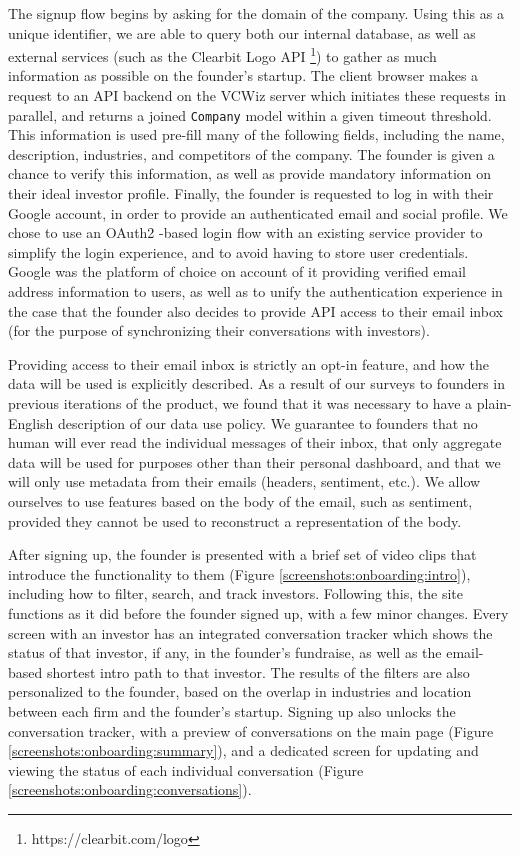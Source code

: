 The signup flow begins by asking for the domain of the company. Using this as a unique identifier, we are able to query both our internal database, as well as external services (such as the Clearbit Logo API \footnote{https://clearbit.com/logo}) to gather as much information as possible on the founder's startup. The client browser makes a request to an API backend on the VCWiz server which initiates these requests in parallel, and returns a joined \texttt{Company} model within a given timeout threshold. This information is used pre-fill many of the following fields, including the name, description, industries, and competitors of the company. The founder is given a chance to verify this information, as well as provide mandatory information on their ideal investor profile. Finally, the founder is requested to log in with their Google account, in order to provide an authenticated email and social profile. We chose to use an OAuth2 \cite{hardt2012oauth}-based login flow with an existing service provider to simplify the login experience, and to avoid having to store user credentials. Google was the platform of choice on account of it providing verified email address information to users, as well as to unify the authentication experience in the case that the founder also decides to provide API access to their email inbox (for the purpose of synchronizing their conversations with investors).

Providing access to their email inbox is strictly an opt-in feature, and how the data will be used is explicitly described. As a result of our surveys to founders in previous iterations of the product, we found that it was necessary to have a plain-English description of our data use policy. We guarantee to founders that no human will ever read the individual messages of their inbox, that only aggregate data will be used for purposes other than their personal dashboard, and that we will only use metadata from their emails (headers, sentiment, etc.).  We allow ourselves to use features based on the body of the email, such as sentiment, provided they cannot be used to reconstruct a representation of the body.

After signing up, the founder is presented with a brief set of video clips that introduce the functionality to them (Figure \ref{screenshots:onboarding:intro}), including how to filter, search, and track investors. Following this, the site functions as it did before the founder signed up, with a few minor changes. Every screen with an investor has an integrated conversation tracker which shows the status of that investor, if any, in the founder's fundraise, as well as the email-based shortest intro path to that investor. The results of the filters are also personalized to the founder, based on the overlap in industries and location between each firm and the founder's startup. Signing up also unlocks the conversation tracker, with a preview of conversations on the main page (Figure \ref{screenshots:onboarding:summary}), and a dedicated screen for updating and viewing the status of each individual conversation (Figure \ref{screenshots:onboarding:conversations}).

